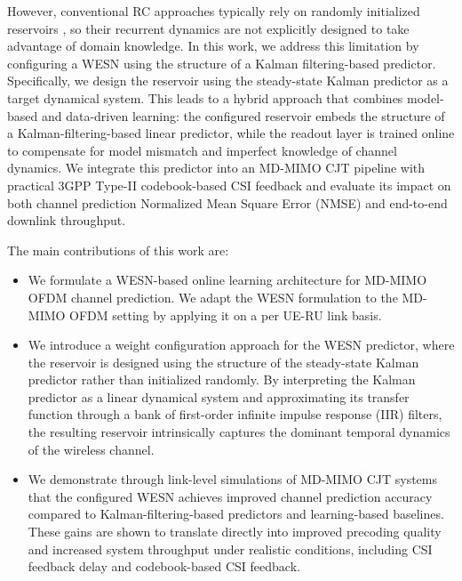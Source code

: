 \documentclass[lettersize,journal]{IEEEtran}
\begin{document}
However, conventional RC approaches typically rely on randomly initialized reservoirs \cite{wiopt}, so their recurrent dynamics are not explicitly designed to take advantage of domain knowledge.
In this work, we address this limitation by configuring a WESN using the structure of a Kalman filtering-based predictor. Specifically, we design the reservoir using the steady-state Kalman predictor as a target dynamical system. 
This leads to a hybrid approach that combines model-based and data-driven learning: the configured reservoir embeds the structure of a Kalman-filtering-based linear predictor, while the readout layer is trained online to compensate for model mismatch and imperfect knowledge of channel dynamics.
We integrate this predictor into an MD-MIMO CJT pipeline with practical 3GPP Type-II codebook-based CSI feedback and evaluate its impact on both channel prediction Normalized Mean Square Error (NMSE) and end-to-end downlink throughput.

The main contributions of this work are:

\begin{itemize}


\item We formulate a WESN-based online learning architecture for MD-MIMO OFDM channel prediction.
We adapt the WESN formulation to the MD-MIMO OFDM setting by applying it on a per UE-RU link basis.

\item We introduce a weight configuration approach for the WESN predictor, where the reservoir is designed using the structure of the steady-state Kalman predictor rather than initialized randomly. By interpreting the Kalman predictor as a linear dynamical system and approximating its transfer function through a bank of first-order infinite impulse response (IIR) filters, the resulting reservoir intrinsically captures the dominant temporal dynamics of the wireless channel.

\item We demonstrate through link-level simulations of MD-MIMO CJT systems that the configured WESN achieves improved channel prediction accuracy compared to Kalman-filtering-based predictors and learning-based baselines. 
These gains are shown to translate directly into improved precoding quality and increased system throughput under realistic conditions, including CSI feedback delay and codebook-based CSI feedback.

\end{itemize}
\end{document}

